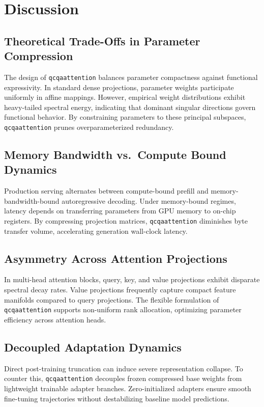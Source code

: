 \section{Discussion}

\subsection{Theoretical Trade-Offs in Parameter Compression}
The design of \texttt{qcqaattention} balances parameter compactness against functional expressivity. In standard dense projections, parameter weights participate uniformly in affine mappings. However, empirical weight distributions exhibit heavy-tailed spectral energy, indicating that dominant singular directions govern functional behavior. By constraining parameters to these principal subspaces, \texttt{qcqaattention} prunes overparameterized redundancy.

\subsection{Memory Bandwidth vs.\ Compute Bound Dynamics}
Production serving alternates between compute-bound prefill and memory-bandwidth-bound autoregressive decoding. Under memory-bound regimes, latency depends on transferring parameters from GPU memory to on-chip registers. By compressing projection matrices, \texttt{qcqaattention} diminishes byte transfer volume, accelerating generation wall-clock latency.

\subsection{Asymmetry Across Attention Projections}
In multi-head attention blocks, query, key, and value projections exhibit disparate spectral decay rates. Value projections frequently capture compact feature manifolds compared to query projections. The flexible formulation of \texttt{qcqaattention} supports non-uniform rank allocation, optimizing parameter efficiency across attention heads.

\subsection{Decoupled Adaptation Dynamics}
Direct post-training truncation can induce severe representation collapse. To counter this, \texttt{qcqaattention} decouples frozen compressed base weights from lightweight trainable adapter branches. Zero-initialized adapters ensure smooth fine-tuning trajectories without destabilizing baseline model predictions.


